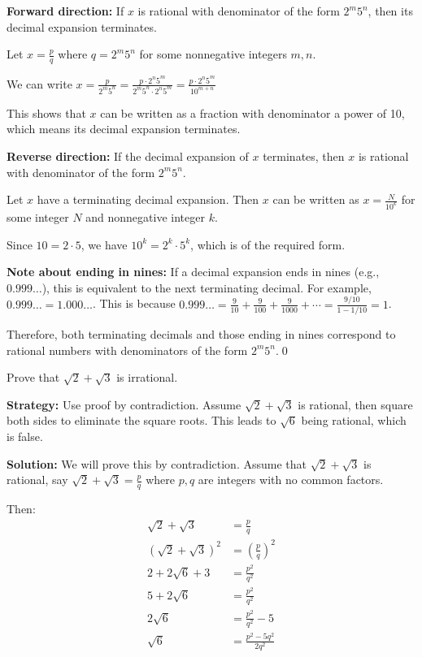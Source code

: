 \textbf{Forward direction:} If $x$ is rational with denominator of the form $2^m 5^n$, then its decimal expansion terminates.

Let $x = \frac{p}{q}$ where $q = 2^m 5^n$ for some nonnegative integers $m, n$.

We can write $x = \frac{p}{2^m 5^n} = \frac{p \cdot 2^n 5^m}{2^m 5^n \cdot 2^n 5^m} = \frac{p \cdot 2^n 5^m}{10^{m+n}}$

This shows that $x$ can be written as a fraction with denominator a power of 10, which means its decimal expansion terminates.

\textbf{Reverse direction:} If the decimal expansion of $x$ terminates, then $x$ is rational with denominator of the form $2^m 5^n$.

Let $x$ have a terminating decimal expansion. Then $x$ can be written as $x = \frac{N}{10^k}$ for some integer $N$ and nonnegative integer $k$.

Since $10 = 2 \cdot 5$, we have $10^k = 2^k \cdot 5^k$, which is of the required form.

\textbf{Note about ending in nines:}
If a decimal expansion ends in nines (e.g., $0.999\ldots$), this is equivalent to the next terminating decimal. For example, $0.999\ldots = 1.000\ldots$. This is because $0.999\ldots = \frac{9}{10} + \frac{9}{100} + \frac{9}{1000} + \cdots = \frac{9/10}{1 - 1/10} = 1$.

Therefore, both terminating decimals and those ending in nines correspond to rational numbers with denominators of the form $2^m 5^n$.\qed


\begin{problembox}
\begin{problemstatement}
Prove that $\sqrt{2} + \sqrt{3}$ is irrational.
\end{problemstatement}
\end{problembox}

\noindent\textbf{Strategy:} Use proof by contradiction. Assume $\sqrt{2} + \sqrt{3}$ is rational, then square both sides to eliminate the square roots. This leads to $\sqrt{6}$ being rational, which is false.

\bigskip\noindent\textbf{Solution:}
We will prove this by contradiction. Assume that $\sqrt{2} + \sqrt{3}$ is rational, say $\sqrt{2} + \sqrt{3} = \frac{p}{q}$ where $p, q$ are integers with no common factors.

Then:
\begin{align*}
\sqrt{2} + \sqrt{3} &= \frac{p}{q} \\
(\sqrt{2} + \sqrt{3})^2 &= \left(\frac{p}{q}\right)^2 \\
2 + 2\sqrt{6} + 3 &= \frac{p^2}{q^2} \\
5 + 2\sqrt{6} &= \frac{p^2}{q^2} \\
2\sqrt{6} &= \frac{p^2}{q^2} - 5 \\
\sqrt{6} &= \frac{p^2 - 5q^2}{2q^2}
\end{align*}

